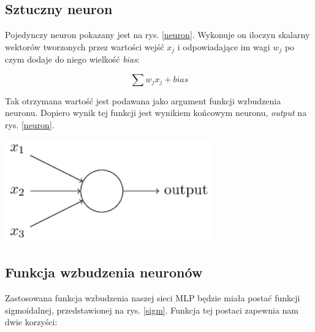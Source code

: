 \subsection{Sztuczny neuron}
Pojedynczy neuron pokazany jest na rys. \ref{neuron}. Wykonuje on iloczyn skalarny wektorów tworzonych przez wartości wejść $x_j$ i odpowiadające im wagi $w_j$ po czym dodaje do niego wielkość \textit{bias}:

\begin{equation}
\sum w_jx_j + bias
\end{equation}

Tak otrzymana wartość jest podawana jako argument funkcji wzbudzenia neuronu. Dopiero wynik tej funkcji jest wynikiem końcowym neuronu, \textit{output} na rys. \ref{neuron}.
\newline
\begin{center}
	\includegraphics[width=9cm]{utils/neuron.png}
	\label{neuron}
\end{center}

\subsection{Funkcja wzbudzenia neuronów}
Zastosowana funkcja wzbudzenia naszej sieci MLP będzie miała postać funkcji sigmoidalnej, przedstawionej na rys. \ref{sigm}.
Funkcja tej postaci zapewnia nam dwie korzyści:

